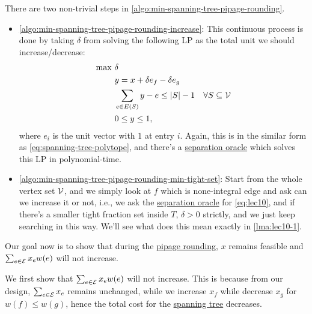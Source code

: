 \begin{remark}
	There are two non-trivial steps in \autoref{algo:min-spanning-tree-pipage-rounding}.
	\begin{itemize}
		\item \autoref{algo:min-spanning-tree-pipage-rounding-increase}: This continuous process is done by taking \(\delta \) from solving the following LP as the total unit we should increase/decrease:
		      \begin{equation}\label{eq:lec10}
			      \begin{aligned}
				      \max~ & \delta                                                                                                    \\
				            & y = x+\delta e_f - \delta e_g                                                                             \\
				            & \sum_{e\in E(S)} y- e \leq \left\vert S \right\vert - 1 & \forall S \subseteq \mathcal{\MakeUppercase{v}} \\
				            & 0 \leq y \leq 1,
			      \end{aligned}
		      \end{equation}
		      where \(e_i\) is the unit vector with \(1\) at entry \(i\). Again, this is in the similar form as \autoref{eq:spanning-tree-polytope}, and there's a \hyperref[rmk:separation-oracle]{separation oracle} which solves this LP in polynomial-time.
		\item \autoref{algo:min-spanning-tree-pipage-rounding-min-tight-set}: Start from the whole vertex set \(\mathcal{\MakeUppercase{v}} \), and we simply look at \(f\) which is none-integral edge and ask can we increase it or not, i.e., we ask the \hyperref[rmk:separation-oracle]{separation oracle} for \autoref{eq:lec10}, and if there's a smaller tight fraction set inside \(T\), \(\delta > 0\) strictly, and we just keep searching in this way. We'll see what does this mean exactly in \autoref{lma:lec10-1}.
	\end{itemize}
\end{remark}

Our goal now is to show that during the \hyperref[algo:min-spanning-tree-pipage-rounding]{pipage rounding}, \(x\) remains feasible and \(\sum_{e\in \mathcal{\MakeUppercase{e}} } x_e w(e)\) will not increase.

We first show that \(\sum_{e\in \mathcal{\MakeUppercase{e}} } x_e w(e)\) will not increase. This is because from our design, \(\sum_{e\in \mathcal{\MakeUppercase{e}} }x_e \) remains unchanged, while we increase \(x_f\) while decrease \(x_g\) for \(w(f) \leq w(g)\), hence the total cost for the \hyperref[def:spanning-tree]{spanning tree} decreases.

